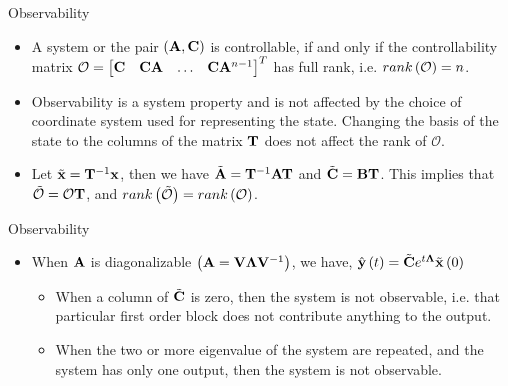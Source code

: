 \documentclass[aspectratio=169]{beamer}
\def\mf{\ensuremath\mathbf}
\def\lp{\ensuremath\left(}
\def\rp{\ensuremath\right)}
\def\bmx{\ensuremath\begin{bmatrix*}[r]}
\def\emx{\ensuremath\end{bmatrix*}}
\newcommand{\ct}[1]{\lp #1\rp}
\begin{document}
\begin{frame}[t]{Observability}
\begin{itemize}
    \item A system or the pair $\ct{\mf{A}, \mf{C}}$ is controllable, if and only if the controllability matrix $\mathcal{O} = \bmx \mf{C} & \mf{C}\mf{A} & \ldots & \mf{C}\mf{A}^{n-1} \emx^T$ has full rank, i.e. $rank\ct{\mathcal{O}} = n$.

    \item Observability is a system property and is not affected by the choice of coordinate system used for representing the state. Changing the basis of the state to the columns of the matrix $\mf{T}$ does not affect the rank of $\mathcal{O}$.

    \item Let $\tilde{\mf{x}} = \mf{T}^{-1}\mf{x}$, then we have $\tilde{\mf{A}} = \mf{T}^{-1}\mf{A}\mf{T}$ and $\tilde{\mf{C}} = \mf{B}\mf{T}$. This implies that $\tilde{\mathcal{O}} = \mathcal{O}\mf{T}$, and $rank\ct{\tilde{\mathcal{O}}} = rank\ct{\mathcal{O}}$.
\end{itemize}
\end{frame}


\begin{frame}[t]{Observability}
\begin{itemize}
    \item When $\mf{A}$ is diagonalizable $\ct{\mf{A} = \mf{V}\mf{\Lambda}\mf{V}^{-1}}$, we have, $\hat{\mf{y}}\ct{t} = \tilde{\mf{C}}e^{t\mf{\Lambda}}\tilde{\mf{x}}\ct{0}$

    \begin{itemize}
        \item When a column of $\tilde{\mf{C}}$ is zero, then the system is not observable, i.e. that particular first order block does not contribute anything to the output.\vspace{0.2cm}

        \item When the two or more eigenvalue of the system are repeated, and the system has only one output, then the system is not observable.
    \end{itemize}
\end{itemize}
\end{frame}
\end{document}

